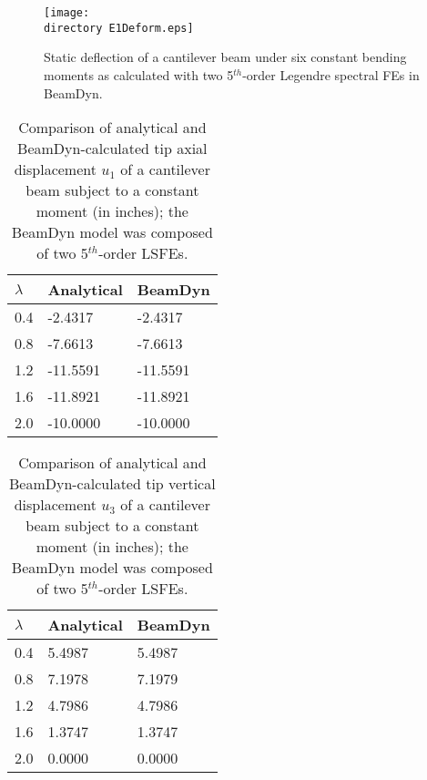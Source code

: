\begin{figure}
    \centering
    \texttt{[image: \\directory E1Deform.eps]}

    \caption{Static deflection of a cantilever beam under six constant
bending moments as calculated with two 5$^{th}$-order Legendre spectral
FEs in BeamDyn.}

    \label{E1Deform}
\end{figure}

\begin{table}[tbp]
\centering 
\caption{Comparison of analytical and BeamDyn-calculated tip axial displacement
$u_1$ of a cantilever beam subject to a constant moment (in inches); the BeamDyn
model was composed of two 5$^{th}$-order LSFEs.}
\label{E1u1} 
	\begin{tabular}{| l | l | l | }
    	\hline
    	$\lambda$ & Analytical & BeamDyn  \\ \hline
    	0.4       & -2.4317    & -2.4317  \\ \hline
    	0.8       & -7.6613    & -7.6613  \\ \hline
    	1.2       & -11.5591   & -11.5591 \\ \hline
    	1.6       & -11.8921   & -11.8921 \\ \hline
    	2.0       & -10.0000   & -10.0000 \\ \hline
    \end{tabular}
\end{table}

\begin{table}[tbp]
\centering 
\caption{Comparison of analytical and BeamDyn-calculated tip vertical displacement
$u_3$ of a cantilever beam subject to a constant moment (in inches); the BeamDyn
model was composed of two 5$^{th}$-order LSFEs.}
\label{E1u3} 
	\begin{tabular}{| l | l | l | }
    	\hline
    	$\lambda$ & Analytical & BeamDyn  \\ \hline
    	0.4       & 5.4987     & 5.4987   \\ \hline
    	0.8       & 7.1978     & 7.1979   \\ \hline
    	1.2       & 4.7986     & 4.7986   \\ \hline
    	1.6       & 1.3747     & 1.3747   \\ \hline
    	2.0       & 0.0000     & 0.0000   \\ \hline
    \end{tabular}
 \end{table}

